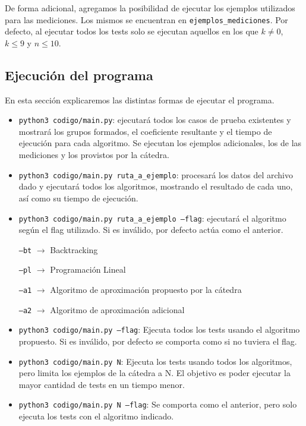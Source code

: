\documentclass{article}
\begin{document}
De forma adicional, agregamos la posibilidad de ejecutar los ejemplos utilizados para las mediciones. Los mismos se encuentran en \texttt{ejemplos\_mediciones}. Por defecto, al ejecutar todos los tests solo se ejecutan aquellos en los que $k \ne 0$, $k \leq 9$ y $n \leq 10$.

\subsection{Ejecución del programa}

En esta sección explicaremos las distintas formas de ejecutar el programa.
\begin{itemize}
    \item \texttt{python3\ codigo/main.py}: ejecutará todos los casos de prueba existentes y mostrará los grupos formados, el coeficiente resultante y el tiempo de ejecución para cada algoritmo. Se ejecutan los ejemplos adicionales, los de las mediciones y los provistos por la cátedra.
    \item \texttt{python3\ codigo/main.py\ ruta\_a\_ejemplo}: procesará los datos del archivo dado y ejecutará todos los algoritmos, mostrando el resultado de cada uno, así como su tiempo de ejecución.
    \item \texttt{python3\ codigo/main.py ruta\_a\_ejemplo\ --flag}: ejecutará el algoritmo según el flag utilizado. Si es inválido, por defecto actúa como el anterior.
    
        \texttt{--bt} $\rightarrow$ Backtracking
        
        \texttt{--pl} $\rightarrow$ Programación Lineal
        
        \texttt{--a1} $\rightarrow$ Algoritmo de aproximación propuesto por la cátedra
        
        \texttt{--a2} $\rightarrow$ Algoritmo de aproximación adicional
    \item \texttt{python3\ codigo/main.py\ --flag}: Ejecuta todos los tests usando el algoritmo propuesto. Si es inválido, por defecto se comporta como si no tuviera el flag.

    \item \texttt{python3\ codigo/main.py\ N}: Ejecuta los tests usando todos los algoritmos, pero limita los ejemplos de la cátedra a N. El objetivo es poder ejecutar la mayor cantidad de tests en un tiempo menor.

    \item \texttt{python3\ codigo/main.py\ N\ --flag}: Se comporta como el anterior, pero solo ejecuta los tests con el algoritmo indicado.
        
\end{itemize}
\end{document}
